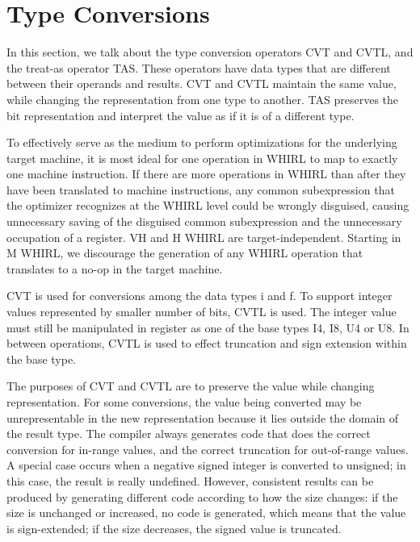 \section{Type Conversions}

In this section, we talk about the type conversion operators
%
CVT
and
%
CVTL, and the treat-as operator TAS. These operators have data
types that are different between their operands and results.
%
CVT and
%
CVTL maintain the same value, while changing the representation
from one type to another. TAS preserves the bit representation and
interpret the value as if it is of a different type.

To effectively serve as the medium to perform optimizations for
the underlying target machine, it is most ideal for one operation
in WHIRL to map to exactly one machine instruction. If there are
more operations in WHIRL than after they have been translated to
machine instructions, any common subexpression that the optimizer
recognizes at the WHIRL level could be wrongly disguised, causing
unnecessary saving of the disguised common subexpression and the
unnecessary occupation of a register. VH and H WHIRL are
target-independent. Starting in M WHIRL, we discourage the generation
of any WHIRL operation that translates to a no-op in the target
machine.

%
CVT is used for conversions among the data types i and f. To support
integer values represented by smaller number of bits,
%
CVTL is used. The integer value must still be manipulated in
register as one of the base types I4,
I8, U4 or U8. In between operations,
%
CVTL is used to effect
truncation and sign extension within the base type.

The purposes of
%
CVT and
%
CVTL are to preserve the value while
changing representation. For some conversions, the value being
converted may be unrepresentable in the new representation because
it lies outside the domain of the result type. The compiler always
generates code that does the correct conversion for in-range values,
and the correct truncation for out-of-range values. A special case
occurs when a negative signed integer is converted to unsigned; in
this case, the result is really undefined. However, consistent
results can be produced by generating different code according to
how the size changes: if the size is unchanged or increased, no code
is generated, which means that the value is sign-extended; if the
size decreases, the signed value is truncated.


